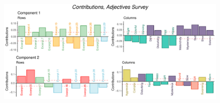 \documentclass[
  english,
  man,floatsintext]{apa6}
\begin{document}
\begin{figure}

{\centering \includegraphics{Music-Descriptor-Space_files/figure-latex/contributionsA-1} 

}

\caption{ }\label{fig:contributionsA}
\end{figure}
\end{document}
